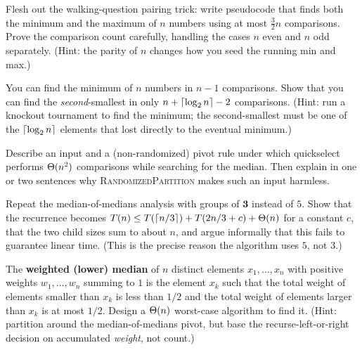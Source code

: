 \begin{exercise}\label{ch09:ex-minmax}
Flesh out the walking-question pairing trick: write pseudocode that finds both the
minimum and the maximum of $n$ numbers using at most $\tfrac{3}{2}n$ comparisons.
Prove the comparison count carefully, handling the cases $n$ even and $n$ odd
separately. (Hint: the parity of $n$ changes how you seed the running min and max.)
\end{exercise}

\begin{exercise}\label{ch09:ex-second-smallest}
You can find the minimum of $n$ numbers in $n-1$ comparisons. Show that you can find
the \emph{second}-smallest in only $n + \lceil\log_2 n\rceil - 2$ comparisons.
(Hint: run a knockout tournament to find the minimum; the second-smallest must be
one of the $\lceil\log_2 n\rceil$ elements that lost directly to the eventual minimum.)
\end{exercise}

\begin{exercise}\label{ch09:ex-worst-case-input}
Describe an input and a (non-randomized) pivot rule under which quickselect performs
$\Theta(n^2)$ comparisons while searching for the median. Then explain in one or two
sentences why \textsc{RandomizedPartition} makes such an input harmless.
\end{exercise}

\begin{exercise}\label{ch09:ex-groups-of-three}
Repeat the median-of-medians analysis with groups of $\mathbf{3}$ instead of $5$.
Show that the recurrence becomes $T(n) \le T(\lceil n/3\rceil) + T(2n/3 + c) + \Theta(n)$ for
a constant $c$, that the two child sizes sum to about $n$, and argue informally that
this fails to guarantee linear time. (This is the precise reason the algorithm uses
$5$, not $3$.)
\end{exercise}

\begin{exercise}\label{ch09:ex-weighted-median}
The \textbf{weighted (lower) median} of $n$ distinct elements $x_1,\dots,x_n$ with
positive weights $w_1,\dots,w_n$ summing to $1$ is the element $x_k$ such that the
total weight of elements smaller than $x_k$ is less than $1/2$ and the total weight
of elements larger than $x_k$ is at most $1/2$. Design a $\Theta(n)$ worst-case
algorithm to find it. (Hint: partition around the median-of-medians pivot, but base
the recurse-left-or-right decision on accumulated \emph{weight}, not count.)
\end{exercise}


